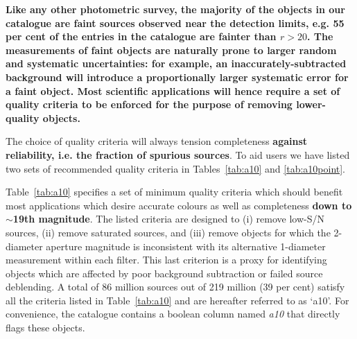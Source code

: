 \documentclass[a4paper,useAMS,usenatbib]{mn2e}
\begin{document}
{\bf
Like any other photometric survey,
the majority of the objects in our catalogue
are faint sources observed near the detection limits,
e.g. 55 per cent of the entries in the catalogue
are fainter than $r > 20$.
The measurements of faint objects
are naturally prone to larger
random and systematic uncertainties:
for example, an inaccurately-subtracted background
will introduce a proportionally larger systematic error
for a faint object.
Most scientific applications will hence require a set of
quality criteria to be enforced for the purpose
of removing lower-quality objects.

The choice of quality criteria will always tension 
completeness {\bf against reliability,
i.e. the fraction of spurious sources}.
To aid users we have listed two sets of
recommended quality criteria 
in Tables~\ref{tab:a10} and \ref{tab:a10point}.

Table~\ref{tab:a10} specifies
a set of minimum quality criteria
which should benefit most applications
which desire accurate colours
as well as completeness {\bf down to $\sim$19th magnitude}.
The listed criteria are designed to 
(i) remove low-S/N sources, 
(ii) remove saturated sources,
and (iii) remove objects for which the 2-diameter
aperture magnitude is inconsistent 
with its alternative 1-diameter measurement
within each filter.
This last criterion is a proxy
for identifying objects which are affected
by poor background subtraction
or failed source deblending.
A total of 86 million sources out of 219 million 
(39 per cent) satisfy all the criteria listed in Table~\ref{tab:a10}
and are hereafter referred to as `a10'.
For convenience, the catalogue contains a boolean column
named \emph{a10} that directly flags these objects.

}
\end{document}
